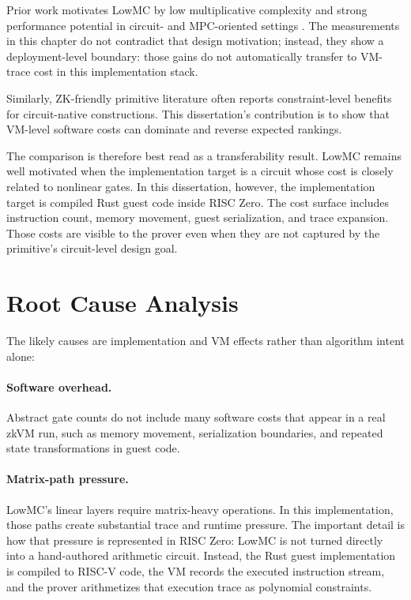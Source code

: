 Prior work motivates LowMC by low multiplicative complexity and strong
performance potential in circuit- and MPC-oriented settings
\cite{albrecht2015ciphers,jaques2019grover}. The measurements in this chapter
do not contradict that design motivation; instead, they show a deployment-level
boundary: those gains do not automatically transfer to VM-trace cost in this
implementation stack.

Similarly, ZK-friendly primitive literature often reports constraint-level
benefits for circuit-native constructions. This dissertation's contribution is to
show that VM-level software costs can dominate and reverse expected rankings.

The comparison is therefore best read as a transferability result. LowMC remains
well motivated when the implementation target is a circuit whose cost is closely
related to nonlinear gates. In this dissertation, however, the implementation
target is compiled Rust guest code inside RISC Zero. The cost surface includes
instruction count, memory movement, guest serialization, and trace expansion.
Those costs are visible to the prover even when they are not captured by the
primitive's circuit-level design goal.

\section{Root Cause Analysis}

The likely causes are implementation and VM effects rather than algorithm intent
alone:

\paragraph{Software overhead.}
Abstract gate counts do not include many software costs that appear in a real
zkVM run, such as memory movement, serialization boundaries, and repeated state
transformations in guest code.

\paragraph{Matrix-path pressure.}
LowMC's linear layers require matrix-heavy operations. In this implementation,
those paths create substantial trace and runtime pressure. The important detail
is how that pressure is represented in RISC Zero: LowMC is not turned directly
into a hand-authored arithmetic circuit. Instead, the Rust guest implementation
is compiled to RISC-V code, the VM records the executed instruction stream, and
the prover arithmetizes that execution trace as polynomial constraints.

